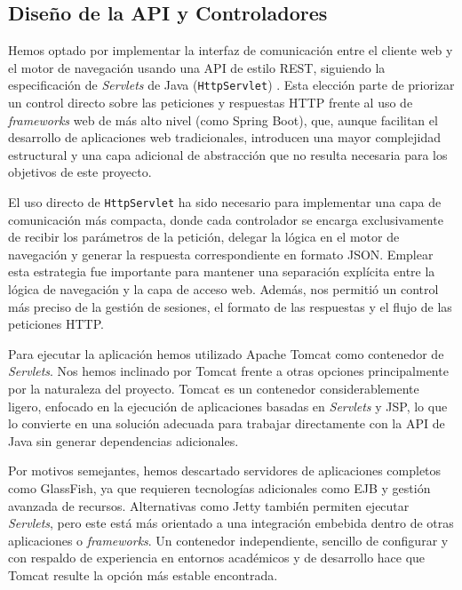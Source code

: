     \subsection*{Diseño de la API y Controladores}

Hemos optado por implementar la interfaz de comunicación entre el cliente web y el motor de navegación
usando una API de estilo REST, siguiendo la especificación de \textit{Servlets} de Java (\texttt{HttpServlet}) \citep{hunter2001servlets}.
Esta elección parte de priorizar un control directo sobre las peticiones y respuestas HTTP frente al uso de
\textit{frameworks} web de más alto nivel (como Spring Boot), que, aunque facilitan el desarrollo de aplicaciones web
tradicionales, introducen una mayor complejidad estructural y una capa adicional de abstracción que no resulta
necesaria para los objetivos de este proyecto.

El uso directo de \texttt{HttpServlet} ha sido necesario para implementar una capa de comunicación más compacta, donde
cada controlador se encarga exclusivamente de recibir los parámetros de la petición, delegar la lógica en el
motor de navegación y generar la respuesta correspondiente en formato JSON. Emplear esta estrategia fue importante
para mantener una separación explícita entre la lógica de navegación y la capa de acceso web. Además, nos permitió un
control más preciso de la gestión de sesiones, el formato de las respuestas y el flujo de las peticiones HTTP.

Para ejecutar la aplicación hemos utilizado Apache Tomcat \citep{brittain2007tomcat} como contenedor de \textit{Servlets}. Nos hemos inclinado por
Tomcat frente a otras opciones principalmente por la naturaleza del proyecto. Tomcat es un contenedor
considerablemente ligero, enfocado en la ejecución de aplicaciones basadas en \textit{Servlets} y JSP, lo que lo convierte en
una solución adecuada para trabajar directamente con la API de Java sin generar dependencias adicionales.

Por motivos semejantes, hemos descartado servidores de aplicaciones completos como GlassFish,
ya que requieren tecnologías adicionales como EJB y gestión avanzada de recursos.
Alternativas como Jetty también permiten ejecutar \textit{Servlets}, pero este está más orientado a una
integración embebida dentro de otras aplicaciones o \textit{frameworks}. Un contenedor independiente,
sencillo de configurar y con respaldo de experiencia en entornos académicos y de desarrollo hace que
Tomcat resulte la opción más estable encontrada.

